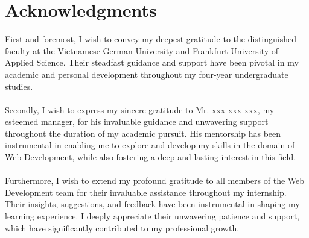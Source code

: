 \section{Acknowledgments}


First and foremost, I wish to convey my deepest gratitude to the distinguished faculty at the Vietnamese-German University and Frankfurt University of Applied Science. Their steadfast guidance and support have been pivotal in my academic and personal development throughout my four-year undergraduate studies. \\ \\
Secondly, I wish to express my sincere gratitude to Mr. xxx xxx xxx, my esteemed manager, for his invaluable guidance and unwavering support throughout the duration of my academic pursuit. His mentorship has been instrumental in enabling me to explore and develop my skills in the domain of Web Development, while also fostering a deep and lasting interest in this field. \\ \\
Furthermore, I wish to extend my profound gratitude to all members of the Web Development team for their invaluable assistance throughout my internship. Their insights, suggestions, and feedback have been instrumental in shaping my learning experience. I deeply appreciate their unwavering patience and support, which have significantly contributed to my professional growth.